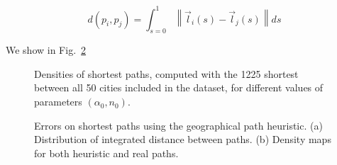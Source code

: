 \documentclass[Royal,sageh,times]{sagej}
\newcommand{\norm}[1]{\left\lVert #1 \right\rVert}
\begin{document}
\[
d(p_i,p_j) = \int_{s=0}^1 \norm{\vec{l}_i (s) - \vec{l}_j (s)} ds
\] 

We show in Fig.~\ref{fig:paths-geodistance}


\begin{figure}

\caption{Densities of shortest paths, computed with the 1225 shortest between all 50 cities included in the dataset, for different values of parameters $(\alpha_0,n_0)$.}
\label{fig:shortest-path-densities}
\end{figure}


\begin{figure}

\caption{Errors on shortest paths using the geographical path heuristic. (a) Distribution of integrated distance between paths. (b) Density maps for both heuristic and real paths.}
\label{fig:paths-geodistance}
\end{figure}



\end{document}

